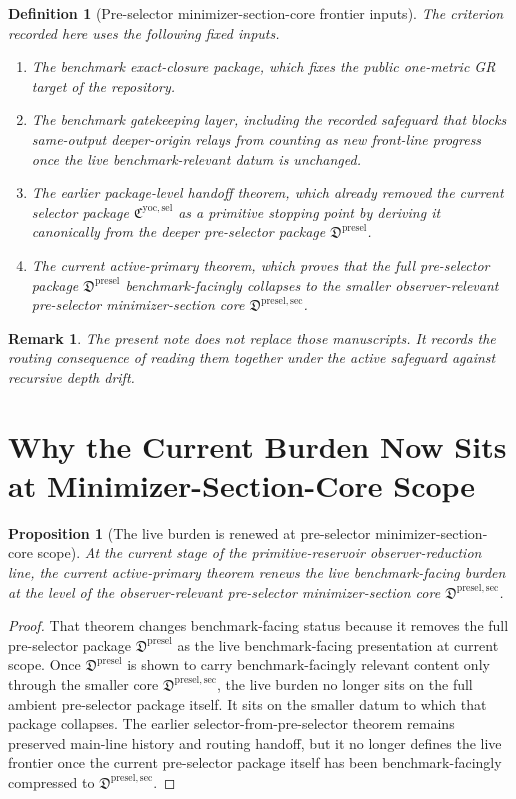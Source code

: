 \documentclass[11pt]{article}
\newcommand{\PreSelectorPackage}{\mathfrak D^{\mathrm{presel}}}
\newcommand{\PreSelectorMinSectionCore}{\mathfrak D^{\mathrm{presel,sec}}}
\newcommand{\YoctoSelectorPackage}{\mathfrak C^{\mathrm{yoc,sel}}}
\newtheorem{definition}{Definition}
\newtheorem{proposition}{Proposition}
\newtheorem{remark}{Remark}
\begin{document}
\begin{definition}[Pre-selector minimizer-section-core frontier inputs]
The criterion recorded here uses the following fixed inputs.
\begin{enumerate}
    \item The benchmark exact-closure package, which fixes the public one-metric GR target of the repository.
    \item The benchmark gatekeeping layer, including the recorded safeguard that blocks same-output deeper-origin relays from counting as new front-line progress once the live benchmark-relevant datum is unchanged.
    \item The earlier package-level handoff theorem, which already removed the current selector package \(\YoctoSelectorPackage\) as a primitive stopping point by deriving it canonically from the deeper pre-selector package \(\PreSelectorPackage\).
    \item The current active-primary theorem, which proves that the full pre-selector package \(\PreSelectorPackage\) benchmark-facingly collapses to the smaller observer-relevant pre-selector minimizer-section core \(\PreSelectorMinSectionCore\).
\end{enumerate}
\end{definition}

\begin{remark}
The present note does not replace those manuscripts. It records the routing consequence of reading them together under the active safeguard against recursive depth drift.
\end{remark}

\section{Why the Current Burden Now Sits at Minimizer-Section-Core Scope}

\begin{proposition}[The live burden is renewed at pre-selector minimizer-section-core scope]
At the current stage of the primitive-reservoir observer-reduction line, the current active-primary theorem renews the live benchmark-facing burden at the level of the observer-relevant pre-selector minimizer-section core \(\PreSelectorMinSectionCore\).
\end{proposition}

\begin{proof}
That theorem changes benchmark-facing status because it removes the full pre-selector package \(\PreSelectorPackage\) as the live benchmark-facing presentation at current scope. Once \(\PreSelectorPackage\) is shown to carry benchmark-facingly relevant content only through the smaller core \(\PreSelectorMinSectionCore\), the live burden no longer sits on the full ambient pre-selector package itself. It sits on the smaller datum to which that package collapses. The earlier selector-from-pre-selector theorem remains preserved main-line history and routing handoff, but it no longer defines the live frontier once the current pre-selector package itself has been benchmark-facingly compressed to \(\PreSelectorMinSectionCore\).
\end{proof}
\end{document}
